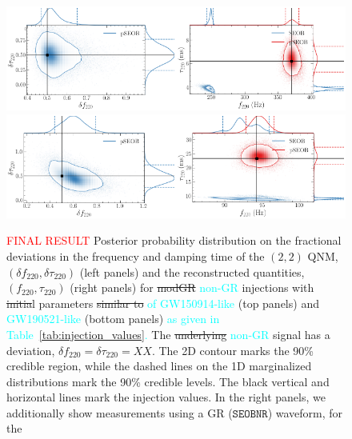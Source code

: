 \documentclass[twocolumn,prd,aps,superscriptaddress,preprintnumbers,tightenlines,showpacs,nofootinbib,eqsecnum,amsfonts,amsmath]{revtex4-1}
\newcommand{\ab}[1]{\textcolor{cyan}{#1}}
\newcommand{\df}[1]{\delta f_{\text{#1}}}
\newcommand{\dtau}[1]{\delta \tau_{\text{#1}}}
\newcommand{\fngr}[1]{f_{\text{#1}}}
\newcommand{\taungr}[1]{\tau_{\text{#1}}}
\newcommand{\SEOB}{\texttt{SEOBNR}}
\begin{document}
\begin{figure}%
\begin{center}
	\includegraphics[width=0.5\textwidth]{figures/GW150914_simulated_signal_0p5_deltaf220_deltatau220.png}\includegraphics[width=0.5\textwidth]{figures/GW150914_simulated_signal_0p5_gr_ngr_fngrtaungr.png}	
	\includegraphics[width=0.5\textwidth]{figures/GW190521_simulated_signal_0p5_deltaf220_deltatau220.png}\includegraphics[width=0.5\textwidth]{figures/GW190521_simulated_signal_0p5_gr_ngr_fngrtaungr.png}
	\caption{\textcolor{red}{FINAL RESULT} Posterior probability distribution on the fractional deviations in the frequency and damping time of the $(2,2)$ QNM, $(\df{220},\dtau{220})$ (left panels) and the reconstructed quantities, $(\fngr{220}, \taungr{220})$ (right panels) for \sout{modGR} \ab{non-GR} injections with \sout{initia}l parameters \sout{similar to} \ab{of GW150914-like} (top panels) and \ab{GW190521-like} (bottom panels) \ab{as given in Table~\ref{tab:injection_values}.} The \sout{underlying} \ab{non-GR} signal has a deviation, $\df{220} = \dtau{220} = XX$. The 2D contour marks the 90\% credible region, while the dashed lines on the 1D marginalized distributions mark the 90\% credible levels. The black vertical and horizontal lines mark the injection values. In the right panels, we additionally show measurements using a GR ($\SEOB$) waveform, for the 
}
\end{center}
\end{figure}
\end{document}
